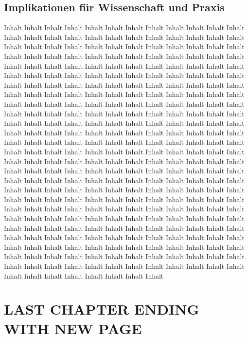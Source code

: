 \documentclass[11pt,a4paper,titlepage]{scrartcl}
\begin{document}
\subsection{Implikationen für Wissenschaft und Praxis}
Inhalt Inhalt Inhalt Inhalt Inhalt Inhalt Inhalt Inhalt Inhalt Inhalt Inhalt Inhalt Inhalt Inhalt Inhalt Inhalt Inhalt Inhalt Inhalt Inhalt Inhalt Inhalt Inhalt Inhalt Inhalt Inhalt Inhalt Inhalt Inhalt Inhalt Inhalt Inhalt Inhalt Inhalt Inhalt Inhalt Inhalt Inhalt Inhalt Inhalt Inhalt Inhalt Inhalt Inhalt Inhalt Inhalt Inhalt Inhalt Inhalt Inhalt Inhalt Inhalt Inhalt Inhalt Inhalt Inhalt Inhalt Inhalt Inhalt Inhalt Inhalt Inhalt Inhalt Inhalt Inhalt Inhalt Inhalt Inhalt Inhalt Inhalt Inhalt Inhalt Inhalt Inhalt Inhalt Inhalt Inhalt Inhalt Inhalt Inhalt Inhalt Inhalt Inhalt Inhalt Inhalt Inhalt Inhalt Inhalt Inhalt Inhalt Inhalt Inhalt Inhalt Inhalt Inhalt Inhalt Inhalt Inhalt Inhalt Inhalt Inhalt Inhalt Inhalt Inhalt Inhalt Inhalt Inhalt Inhalt Inhalt Inhalt Inhalt Inhalt Inhalt Inhalt Inhalt Inhalt Inhalt Inhalt Inhalt Inhalt Inhalt Inhalt Inhalt Inhalt Inhalt Inhalt Inhalt Inhalt Inhalt Inhalt Inhalt Inhalt Inhalt Inhalt Inhalt Inhalt Inhalt Inhalt Inhalt Inhalt Inhalt Inhalt Inhalt Inhalt Inhalt Inhalt Inhalt Inhalt Inhalt Inhalt Inhalt Inhalt Inhalt Inhalt Inhalt Inhalt Inhalt Inhalt Inhalt Inhalt Inhalt Inhalt Inhalt Inhalt Inhalt Inhalt Inhalt Inhalt Inhalt Inhalt Inhalt Inhalt Inhalt Inhalt Inhalt Inhalt Inhalt Inhalt Inhalt Inhalt Inhalt Inhalt Inhalt Inhalt Inhalt Inhalt Inhalt Inhalt Inhalt Inhalt Inhalt Inhalt Inhalt Inhalt Inhalt Inhalt Inhalt Inhalt Inhalt Inhalt Inhalt Inhalt Inhalt Inhalt Inhalt Inhalt Inhalt Inhalt Inhalt Inhalt Inhalt Inhalt Inhalt Inhalt Inhalt Inhalt Inhalt Inhalt Inhalt Inhalt Inhalt Inhalt Inhalt Inhalt Inhalt Inhalt Inhalt Inhalt Inhalt Inhalt Inhalt Inhalt Inhalt Inhalt Inhalt Inhalt Inhalt Inhalt Inhalt Inhalt Inhalt Inhalt Inhalt Inhalt Inhalt Inhalt Inhalt Inhalt Inhalt Inhalt Inhalt Inhalt Inhalt Inhalt Inhalt Inhalt Inhalt Inhalt Inhalt Inhalt Inhalt Inhalt Inhalt Inhalt Inhalt Inhalt Inhalt Inhalt Inhalt Inhalt Inhalt Inhalt Inhalt Inhalt Inhalt Inhalt Inhalt Inhalt Inhalt Inhalt Inhalt Inhalt Inhalt Inhalt Inhalt Inhalt Inhalt Inhalt Inhalt Inhalt Inhalt Inhalt Inhalt Inhalt Inhalt Inhalt Inhalt Inhalt Inhalt Inhalt Inhalt Inhalt Inhalt Inhalt Inhalt Inhalt Inhalt Inhalt Inhalt Inhalt Inhalt Inhalt Inhalt Inhalt Inhalt Inhalt Inhalt Inhalt Inhalt Inhalt 


\section{LAST CHAPTER ENDING WITH NEW PAGE}
\end{document}
